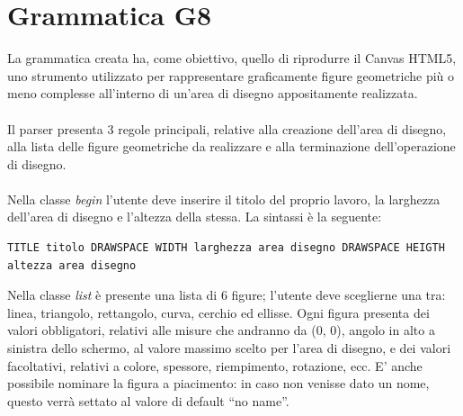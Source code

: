 \documentclass[a4paper]{article}
\begin{document}
\newpage

\section{Grammatica G8}
La grammatica creata ha, come obiettivo, quello di riprodurre il Canvas HTML5, uno strumento utilizzato per rappresentare graficamente figure geometriche più o meno complesse all’interno di un’area di disegno appositamente realizzata.
\\
\\
Il parser presenta 3 regole principali, relative alla creazione dell’area di disegno, alla lista delle figure geometriche da realizzare e alla terminazione dell’operazione di disegno.
\\
\\
Nella classe \textit{begin} l'utente deve inserire il titolo del proprio lavoro, la larghezza dell'area di disegno e l'altezza della stessa. La sintassi è la seguente:
\begin{verbatim}
TITLE titolo DRAWSPACE WIDTH larghezza area disegno DRAWSPACE HEIGTH altezza area disegno
\end{verbatim}
Nella classe \textit{list} è presente una lista di 6 figure; l'utente deve sceglierne una tra: linea, triangolo, rettangolo, curva, cerchio ed ellisse. Ogni figura presenta dei valori obbligatori, relativi alle misure che andranno da (0, 0), angolo in alto a sinistra dello schermo, al valore massimo scelto per l’area di disegno, e dei valori facoltativi, relativi a colore, spessore, riempimento, rotazione, ecc. E’ anche possibile nominare la figura a piacimento: in caso non venisse dato un nome, questo verrà settato al valore di default “no name”.
\end{document}

